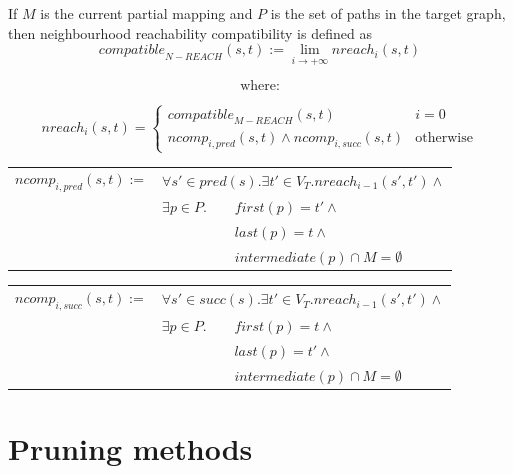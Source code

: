 \begin{minipage}{\textwidth}
\begin{defn}

If $M$ is the current partial mapping and $P$ is the set of paths in the target graph, then neighbourhood reachability compatibility is defined as $$\mathit{compatible}_{\mathit{N-REACH}}(s,t):= \lim_{i\to +\infty} \mathit{nreach}_i(s, t) $$

$$\text{where:}$$

$$\mathit{nreach}_i(s, t) = \begin{cases}
                \mathit{compatible}_{\mathit{M-REACH}}(s,t)   & i = 0\\
               \mathit{ncomp}_{i, \mathit{pred}}(s, t) \land \mathit{ncomp}_{i, \mathit{succ}}(s, t) & \text{otherwise}
           \end{cases}$$

\vspace{10pt}

\begin{tabular}{lll}
\centering
$\mathit{ncomp}_{i, \mathit{pred}}(s, t) := $&\multicolumn{2}{l}{$\forall s' \in \mathit{pred}(s) . \exists t' \in V_T . \mathit{nreach}_{i-1}(s',t') \land $}\\
&$\exists p \in P .$  & $\mathit{first}(p)=t' \land$ \\
&&$\mathit{last}(p)=t \land$ \\
&&$\mathit{intermediate}(p) \cap M = \emptyset$
\end{tabular}

\begin{tabular}{lll}

$\mathit{ncomp}_{i, \mathit{succ}}(s, t) := $&\multicolumn{2}{l}{$\forall s' \in \mathit{succ}(s) . \exists t' \in V_T . \mathit{nreach}_{i-1}(s',t') \land $}\\
&$\exists p \in P .$  & $\mathit{first}(p)=t \land$ \\
&&$\mathit{last}(p)=t' \land$ \\
&&$\mathit{intermediate}(p) \cap M = \emptyset$
\end{tabular}

\end{defn}
\end{minipage}

\section{Pruning methods}
\label{sec:pruningmethods}
